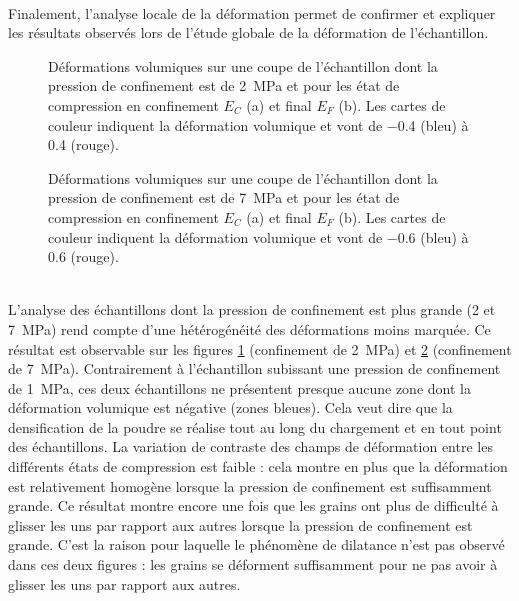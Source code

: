 		\\Finalement, l'analyse locale de la déformation permet de confirmer et expliquer les résultats observés lors de l'étude globale de la déformation de l'échantillon.
		\begin{figure}[]\centering
			\hfill
			\caption{\label{fig04:champs_deformations_2MPa} Déformations volumiques sur une coupe de l'échantillon dont la pression de confinement est de \SI{2}{\mega\pascal} et pour les état de compression en confinement $E_C$ (a) et final $E_F$ (b). Les cartes de couleur indiquent la déformation volumique et vont de \num{-0.4} (bleu) à \num{0.4} (rouge).}
		\end{figure}
		\begin{figure}[h]\centering
			\hfill
			\caption{\label{fig04:champs_deformations_7MPa} Déformations volumiques sur une coupe de l'échantillon dont la pression de confinement est de \SI{7}{\mega\pascal} et pour les état de compression en confinement $E_C$ (a) et final $E_F$ (b). Les cartes de couleur indiquent la déformation volumique et vont de \num{-0.6} (bleu) à \num{0.6} (rouge).}
		\end{figure}
		\\L'analyse des échantillons dont la pression de confinement est plus grande (\num{2} et \SI{7}{\mega\pascal}) rend compte d'une hétérogénéité des déformations moins marquée. Ce résultat est observable sur les figures \ref{fig04:champs_deformations_2MPa} (confinement de \SI{2}{\mega\pascal}) et \ref{fig04:champs_deformations_7MPa} (confinement de \SI{7}{\mega\pascal}). Contrairement à l'échantillon subissant une pression de confinement de \SI{1}{\mega\pascal}, ces deux échantillons ne présentent presque aucune zone dont la déformation volumique est négative (zones bleues). Cela veut dire que la densification de la poudre se réalise tout au long du chargement et en tout point des échantillons. La variation de contraste des champs de déformation entre les différents états de compression est faible : cela montre en plus que la déformation est relativement homogène lorsque la pression de confinement est suffisamment grande. Ce résultat montre encore une fois que les grains ont plus de difficulté à glisser les uns par rapport aux autres lorsque la pression de confinement est grande. C'est la raison pour laquelle le phénomène de dilatance n'est pas observé dans ces deux figures : les grains se déforment suffisamment pour ne pas avoir à glisser les uns par rapport aux autres.
		